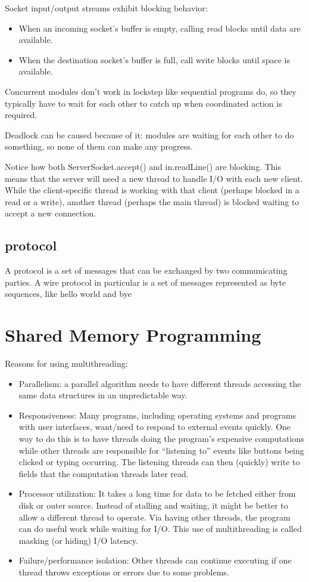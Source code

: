 \documentclass[letterpaper,12pt]{article}
\begin{document}
Socket input/output streams exhibit blocking behavior:\begin{itemize}
      \item When an incoming socket's buffer is empty, calling read blocks until data are available.
      \item When the destination socket's buffer is full, call write blocks until space is available.
\end{itemize}

Concurrent modules don't work in lockstep like sequential programs do, so they typically have to wait for each other to catch up when coordinated action is required.

Deadlock can be caused because of it: modules are waiting for each other to do something, so none of them can make any progress.

Notice how both ServerSocket.accept() and in.readLine() are blocking. This means that the server will need a new thread to handle I/O with each new client. While the client-specific thread is working with that client (perhaps blocked in a read or a write), another thread (perhaps the main thread) is blocked waiting to accept a new connection.
\subsection{protocol}
A protocol is a set of messages that can be exchanged by two communicating parties. A wire protocol in particular is a set of messages represented as byte sequences, like hello world and bye


\section{Shared Memory Programming}
Reasons for using multithreading:
\begin{itemize}
      \item Parallelism: a parallel algorithm needs to have different threads accessing the same data structures in an unpredictable way.
      \item Responsiveness: Many programs, including operating systems and programs with user interfaces, want/need to respond to external events quickly. One way to do this is to have threads doing the program's expensive computations while other threads are responsible for ``listening to'' events like buttons being clicked or typing occurring. The listening threads can then (quickly) write to fields that the computation threads later read.
      \item Processor utilization: It takes a long time for data to be fetched either from disk or outer source. Instead of stalling and waiting, it might be better to allow a different thread to operate. Via having other threads, the program can do useful work while waiting for I/O. This use of multithreading is called masking (or hiding) I/O latency.
      \item Failure/performance isolation: Other threads can continue executing if one thread throws exceptions or errors due to some problems.
\end{itemize}
\end{document}
